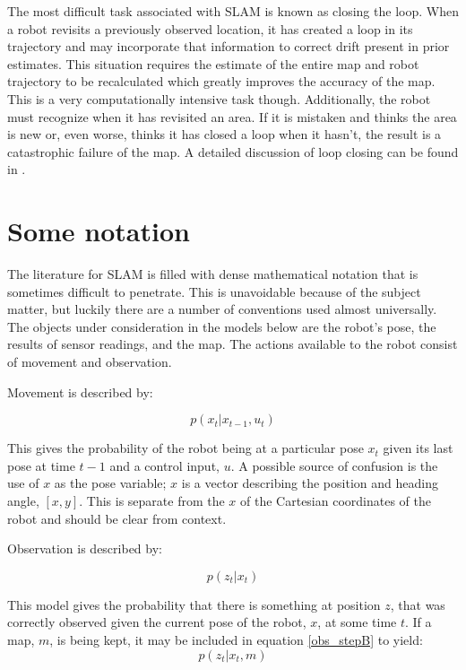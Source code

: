 \documentclass[12pt]{article}
\begin{document}
The most difficult task associated with SLAM is known as closing the loop.  When a robot revisits a previously observed location, it has created a loop in its trajectory and may incorporate that information to correct drift present in prior estimates.  This situation requires the estimate of the entire map and robot trajectory to be recalculated which greatly improves the accuracy of the map.  This is a very computationally intensive task though.  Additionally, the robot must recognize when it has revisited an area.  If it is mistaken and thinks the area is new or, even worse, thinks it has closed a loop when it hasn’t, the result is a catastrophic failure of the map.  A detailed discussion of loop closing can be found in \cite{LoopClosing}.

\section{Some notation}

The literature for SLAM is filled with dense mathematical notation that is sometimes difficult to penetrate.  This is unavoidable because of the subject matter, but luckily there are a number of conventions used almost universally.  The objects under consideration in the models below are the robot’s pose, the results of sensor readings, and the map.  The actions available to the robot consist of movement and observation.  

Movement is described by:

\begin{equation}\label{predict_stepB}
p(x_{t}|x_{t-1},u_{t})
\end{equation}

This gives the probability of the robot being at a particular pose $x_{t}$ given its last pose at time $t-1$ and a control input, $u$.  A possible source of confusion is the use of $x$ as the pose variable;  $x$ is a vector describing the position and heading angle, $[x,y]$. This is separate from the $x$ of the Cartesian coordinates of the robot and should be clear from context.  

Observation is described by:

\begin{equation}\label{obs_stepB}
p(z_{t}|x_{t})
\end{equation}
   
This model gives the probability that there is something at position $z$, that was correctly observed given the current pose of the robot, $x$, at some time $t$.  If a map, $m$, is being kept, it may be included in equation \ref{obs_stepB} to yield:
\begin{equation}\label{obs_step_mapB}
p(z_{t}|x_{t},m)
\end{equation}
\end{document}
